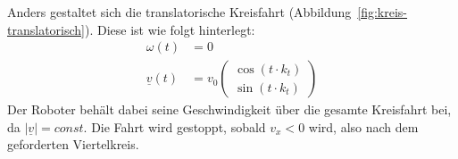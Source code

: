 Anders gestaltet sich die translatorische Kreisfahrt (Abbildung~\ref{fig:kreis-translatorisch}). Diese ist wie folgt hinterlegt:
\begin{align*}
    \omega(t) &= 0 \\
    \underline{v}(t) &= v_0
        \begin{pmatrix}
            \cos(t \cdot k_t) \\
            \sin(t \cdot k_t)
        \end{pmatrix}
\end{align*}
Der Roboter behält dabei seine Geschwindigkeit über die gesamte Kreisfahrt bei, da $\left|\underline{v}\right| = const$. Die Fahrt wird gestoppt, sobald $v_x < 0$ wird, also nach dem geforderten Viertelkreis.
